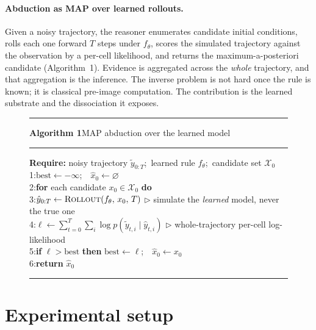 \documentclass{article}
\begin{document}
\paragraph{Abduction as MAP over learned rollouts.}
Given a noisy trajectory, the reasoner enumerates candidate initial conditions, rolls each one
forward $T$ steps under $f_\theta$, scores the simulated trajectory against the observation by a
per-cell likelihood, and returns the maximum-a-posteriori candidate (Algorithm~1).
Evidence is aggregated across the \emph{whole} trajectory, and that aggregation is the inference.
The inverse problem is not hard once the rule is known; it is classical pre-image computation. The
contribution is the learned substrate and the dissociation it exposes.

\begin{figure}[t]
\centering
\begin{minipage}{0.96\linewidth}
\hrule\vspace{2.5pt}
{\small\textbf{Algorithm 1}\quad MAP abduction over the learned model}\vspace{2.5pt}
\hrule\vspace{4pt}
{\small
\textbf{Require:} noisy trajectory $\tilde{y}_{0:T}$;\ learned rule $f_\theta$;\ candidate set $\mathcal{X}_0$\\[2pt]
1:\quad $\text{best} \gets -\infty$;\ \ $\hat{x}_0 \gets \varnothing$\\
2:\quad \textbf{for} each candidate $x_0 \in \mathcal{X}_0$ \textbf{do}\\
3:\quad\quad $\hat{y}_{0:T} \gets \textsc{Rollout}(f_\theta,\, x_0,\, T)$ \hfill $\triangleright$ simulate the \emph{learned} model, never the true one\\
4:\quad\quad $\ell \gets \sum_{t=0}^{T}\sum_i \log p(\tilde{y}_{t,i} \mid \hat{y}_{t,i})$ \hfill $\triangleright$ whole-trajectory per-cell log-likelihood\\
5:\quad\quad \textbf{if} $\ell > \text{best}$ \textbf{then} $\text{best} \gets \ell$;\ \ $\hat{x}_0 \gets x_0$\\
6:\quad \textbf{return} $\hat{x}_0$
}\vspace{4pt}
\hrule
\end{minipage}
\end{figure}



\section{Experimental setup}
\label{sec:setup}
\end{document}
